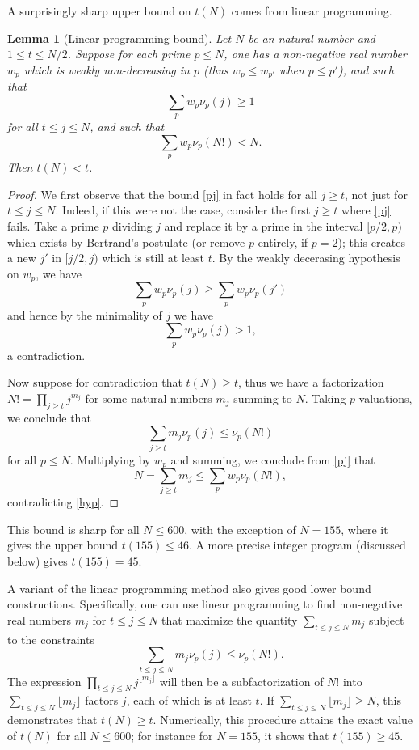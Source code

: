 \documentclass[12pt,a4paper,reqno]{amsart}
\numberwithin{equation}{section}
\theoremstyle{plain}
\newtheorem{lemma}[theorem]{Lemma}
\theoremstyle{definition}
\begin{document}
A surprisingly sharp upper bound on $t(N)$ comes from linear programming.

\begin{lemma}[Linear programming bound]\label{lp-upper}  Let $N$ be an natural number and $1 \leq t \leq N/2$.  Suppose for each prime $p \leq N$, one has a non-negative real number $w_p$ which is weakly non-decreasing in $p$ (thus $w_p \leq w_{p'}$ when $p \leq p'$), and such that
  \begin{equation}\label{pj}
   \sum_p w_p \nu_p(j) \geq 1
  \end{equation}
  for all $t \leq j \leq N$, and such that
  \begin{equation}\label{hyp}
  \sum_p w_p \nu_p(N!) < N.
  \end{equation}
  Then $t(N) < t$.
  \end{lemma}
  
  \begin{proof}
  We first observe that the bound \eqref{pj} in fact holds for all $j \geq t$, not just for $t \leq j \leq N$.  Indeed, if this were not the case, consider the first $j \geq t$ where \eqref{pj} fails.  Take a prime $p$ dividing $j$ and replace it by a prime in the interval $[p/2,p)$ which exists by Bertrand's postulate (or remove $p$ entirely, if $p=2$); this creates a new $j'$ in $[j/2,j)$ which is still at least $t$.  By the weakly decerasing hypothesis on $w_p$, we have
  $$ \sum_p w_p \nu_p(j) \geq \sum_p w_p \nu_p(j')$$
  and hence by the minimality of $j$ we have
  $$ \sum_p w_p \nu_p(j) > 1, $$
  a contradiction.
  
  Now suppose for contradiction that $t(N) \geq t$, thus we have a factorization $N! = \prod_{j \geq t} j^{m_j}$ for some natural numbers $m_j$ summing to $N$.  Taking $p$-valuations, we conclude that
  $$ \sum_{j \geq t} m_j \nu_p(j) \leq \nu_p(N!)$$
  for all $p \leq N$.  Multiplying by $w_p$ and summing, we conclude from \eqref{pj} that
  $$ N = \sum_{j \geq t} m_j \leq \sum_p w_p \nu_p(N!),$$
  contradicting \eqref{hyp}.
  \end{proof}
  
  This bound is sharp for all $N \leq 600$, with the exception of $N=155$, where it gives the upper bound $t(155) \leq 46$.  A more precise integer program (discussed below) gives $t(155) = 45$.

  
A variant of the linear programming method also gives good lower bound constructions. Specifically, one can use linear programming to find non-negative real numbers $m_j$ for $t \leq j \leq N$ that maximize the quantity $\sum_{t \leq j \leq N} m_j$ subject to the constraints
    $$ \sum_{t \leq j \leq N} m_j \nu_p(j) \leq \nu_p(N!).$$
  The expression $\prod_{t \leq j \leq N} j^{\lfloor m_j\rfloor}$ will then be a subfactorization of $N!$ into $\sum_{t \leq j \leq N} \lfloor m_j \rfloor$ factors $j$, each of which is at least $t$. If $\sum_{t \leq j \leq N} \lfloor m_j \rfloor \geq N$, this demonstrates that $t(N) \geq t$.  Numerically, this procedure attains the exact value of $t(N)$ for all $N \leq 600$; for instance for $N=155$, it shows that $t(155) \geq 45$.
\end{document}
